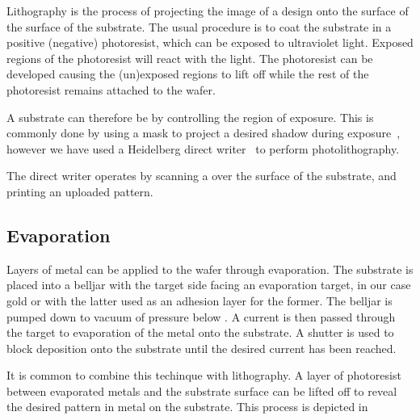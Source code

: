 Lithography is the process of projecting the image of a design onto the surface
of the surface of the substrate. The usual procedure is to coat the substrate
in a positive (negative)  photoresist, which can be exposed to
ultraviolet light. Exposed regions of the photoresist will react with the
light. The photoresist can be developed causing the (un)exposed regions to lift
off while the rest of the photoresist remains attached to the wafer.

A substrate can therefore be  by controlling the region of
exposure. This is commonly done by using a mask to project a desired shadow
during exposure~\cite{}, however we have used a Heidelberg direct
writer~\cite{} to perform photolithography.

The direct writer operates by scanning a  over the surface of the
substrate, and printing an uploaded pattern.


\subsection{Evaporation}

Layers of metal can be applied to the wafer through evaporation. The substrate
is placed into a belljar 
with the target side facing an evaporation target, in our case gold or
 with the latter used as an adhesion layer for the former. The
belljar is pumped down to vacuum of pressure below . A current is then
passed through the target to  evaporation of the metal onto the
substrate. A shutter is used to block deposition onto the substrate until the
desired current has been reached.

It is common to combine this techinque with lithography. A layer of photoresist
between evaporated metals and the substrate surface can be lifted off to reveal
the desired pattern in metal on the substrate.  This process is
depicted in 

\begin{figure}
  \caption{}
  \label{fab:fig:photolith}
\end{figure}


